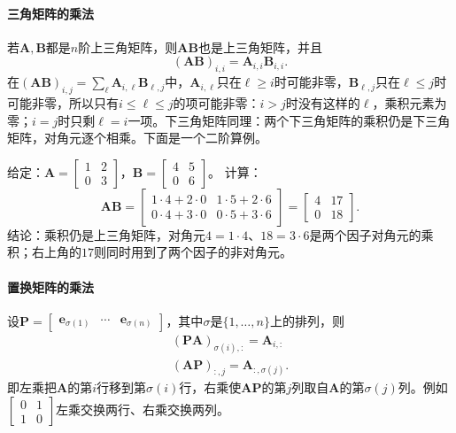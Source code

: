 \paragraph{三角矩阵的乘法}
若$\bm A,\bm B$都是$n$阶上三角矩阵，则$\bm A\bm B$也是上三角矩阵，并且
\[
 (\bm A\bm B)_{i,i}=\bm A_{i,i}\bm B_{i,i}.
\]
在$(\bm A\bm B)_{i,j}=\sum_\ell\bm A_{i,\ell}\bm B_{\ell,j}$中，$\bm A_{i,\ell}$只在$\ell\geq i$时可能非零，$\bm B_{\ell,j}$只在$\ell\leq j$时可能非零，所以只有$i\leq\ell\leq j$的项可能非零：$i>j$时没有这样的$\ell$，乘积元素为零；$i=j$时只剩$\ell=i$一项。下三角矩阵同理：两个下三角矩阵的乘积仍是下三角矩阵，对角元逐个相乘。下面是一个二阶算例。
\begin{example}[两个上三角矩阵的乘积]
\label{ex:ls-upper-triangular-product}
给定：$\bm A=\left[\begin{smallmatrix}1&2\\0&3\end{smallmatrix}\right]$，$\bm B=\left[\begin{smallmatrix}4&5\\0&6\end{smallmatrix}\right]$。
计算：
\[
 \bm A\bm B=\begin{bmatrix}1\cdot4+2\cdot0&1\cdot5+2\cdot6\\0\cdot4+3\cdot0&0\cdot5+3\cdot6\end{bmatrix}=\begin{bmatrix}4&17\\0&18\end{bmatrix}.
\]
结论：乘积仍是上三角矩阵，对角元$4=1\cdot4$、$18=3\cdot6$是两个因子对角元的乘积；右上角的$17$则同时用到了两个因子的非对角元。
\end{example}

\paragraph{置换矩阵的乘法}
设$\bm P=\left[\begin{smallmatrix}\bm e_{\sigma(1)}&\cdots&\bm e_{\sigma(n)}\end{smallmatrix}\right]$，其中$\sigma$是$\{1,\ldots,n\}$上的排列，则
\[
 \begin{gathered}
(\bm P\bm A)_{\sigma(i),:}=\bm A_{i,:}\\
(\bm A\bm P)_{:,j}=\bm A_{:,\sigma(j)}.
 \end{gathered}
\]
即左乘把$\bm A$的第$i$行移到第$\sigma(i)$行，右乘使$\bm A\bm P$的第$j$列取自$\bm A$的第$\sigma(j)$列。例如$\left[\begin{smallmatrix}0&1\\1&0\end{smallmatrix}\right]$左乘交换两行、右乘交换两列。

